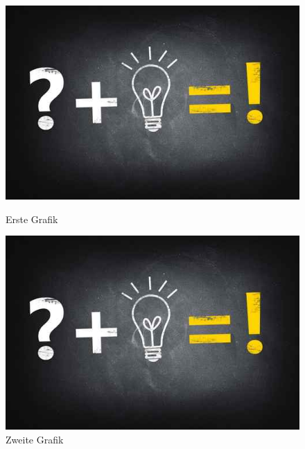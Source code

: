 \begin{figure}[!ht]
    \centering
    \begin{minipage}[b]{.45\textwidth} %
        \includegraphics[width=\textwidth]{images/test.jpg}
        \caption[Vollwertige Grafiken (1)]{Erste Grafik}
        \label{spielwiese:vollwertig1}
    \end{minipage}
    \hspace{.05\textwidth}
    \begin{minipage}[b]{.45\textwidth} %
        \includegraphics[width=\textwidth]{images/test.jpg}
        \caption[Vollwertige Grafiken (2)]{Zweite Grafik}
        \label{spielwiese:vollwertig2}
    \end{minipage}
\end{figure}

\clearpage

